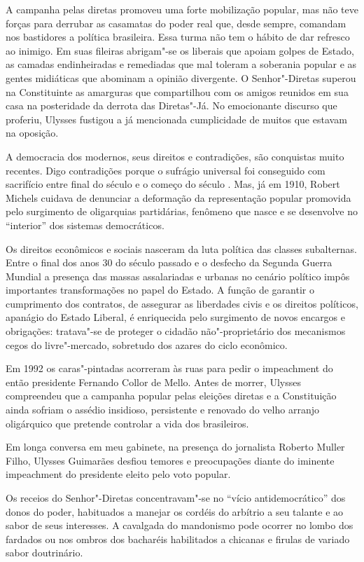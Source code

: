 A campanha pelas diretas promoveu uma forte mobilização popular, mas não
teve forças para derrubar as casamatas do poder real que, desde sempre,
comandam nos bastidores a política brasileira. Essa turma não tem o
hábito de dar refresco ao inimigo. Em suas fileiras abrigam"-se os
liberais que apoiam golpes de Estado, as camadas endinheiradas e
remediadas que mal toleram a soberania popular e as gentes midiáticas
que abominam a opinião divergente. O Senhor"-Diretas superou na
Constituinte as amarguras que compartilhou com os amigos reunidos em sua
casa na posteridade da derrota das Diretas"-Já. No emocionante discurso
que proferiu, Ulysses fustigou a já mencionada cumplicidade de muitos
que estavam na oposição.

A democracia dos modernos, seus direitos e contradições, são conquistas
muito recentes. Digo contradições porque o sufrágio universal foi
conseguido com sacrifício entre final do século  e o começo do século
. Mas, já em 1910, Robert Michels cuidava de denunciar a deformação da
representação popular promovida pelo surgimento de oligarquias
partidárias, fenômeno que nasce e se desenvolve no ``interior'' dos
sistemas democráticos.

Os direitos econômicos e sociais nasceram da luta política das classes
subalternas. Entre o final dos anos 30 do século passado e o desfecho da
Segunda Guerra Mundial a presença das massas assalariadas e
urbanas no cenário político impôs importantes transformações no papel do
Estado. A função de garantir o cumprimento dos contratos, de assegurar
as liberdades civis e os direitos políticos, apanágio do Estado Liberal,
é enriquecida pelo surgimento de novos encargos e obrigações: tratava"-se
de proteger o cidadão não"-proprietário dos mecanismos cegos do livre"-mercado,
sobretudo dos azares do ciclo econômico.

Em 1992 os caras"-pintadas acorreram às ruas para pedir o impeachment do
então presidente Fernando Collor de Mello. Antes de morrer, Ulysses
compreendeu que a campanha popular pelas eleições diretas e a
Constituição ainda sofriam o assédio insidioso, persistente e renovado
do velho arranjo oligárquico que pretende controlar a vida dos
brasileiros.

Em longa conversa em meu gabinete, na presença do jornalista Roberto
Muller Filho, Ulysses Guimarães desfiou temores e preocupações diante do
iminente impeachment do presidente eleito pelo voto popular.

Os receios do Senhor"-Diretas concentravam"-se no ``vício
antidemocrático'' dos donos do poder, habituados a manejar os cordéis do
arbítrio a seu talante e ao sabor de seus interesses. A cavalgada do
mandonismo pode ocorrer no lombo dos fardados ou nos ombros dos
bacharéis habilitados a chicanas e firulas de variado sabor doutrinário.

